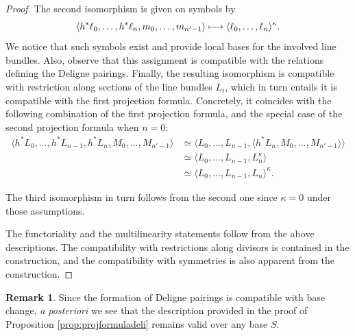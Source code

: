 \documentclass[11pt]{article}
\newcommand\mto{\mathchoice{\longmapsto}{\mapsto}{\mapsto}{\mapsto}}
\theoremstyle{plain}
\theoremstyle{definition}
\newtheorem{remark}[theorem]{Remark}
\begin{document}
\begin{proof}
The second isomorphism is given on symbols by
\begin{equation}\label{eq:explicit-second-projection-formula}
\langle h^{\ast} \ell_{0},\ldots, h^{\ast}\ell_{n},m_{0},\ldots, m_{n^{\prime}-1}\rangle\mto \langle \ell_{0},\ldots,\ell_{n} \rangle^{\kappa}.
\end{equation}
We notice that such symbols exist and provide local bases for the involved line bundles. Also, observe that this assignment is compatible with the relations defining the Deligne pairings. Finally, the resulting isomorphism is compatible with restriction along sections of the line bundles $L_{i}$, which in turn entails it is compatible with the first projection formula. Concretely, it coincides with the following combination of the first projection formula, and the special case of the second projection formula when $n=0$:
\begin{displaymath}
\begin{split}
\langle h^\ast L_0, \ldots, h^\ast L_{n-1}, h^\ast L_n, M_0, \ldots, M_{n'-1} \rangle & \simeq \langle L_0, \ldots, L_{n-1}, \langle h^\ast L_n, M_0, \ldots, M_{n'-1} \rangle \rangle \\
& \simeq \langle L_0, \ldots, L_{n-1}, L_n^{\kappa} \rangle \\
& \simeq \langle L_0, \ldots, L_{n-1}, L_n \rangle^{\kappa}.
\end{split}
\end{displaymath}

The third isomorphism in turn follows from the second one since $\kappa = 0$ under those assumptions.

The functoriality and the multilinearity statements follow from the above descriptions. The compatibility with restrictions along divisors is contained in the construction, and the compatibility with symmetries is also apparent from the construction.
\end{proof}

\begin{remark}
Since the formation of Deligne pairings is compatible with base change, \emph{a posteriori} we see that the description provided in the proof of Proposition \ref{prop:projformuladeli} remains valid over any base $S$.
\end{remark}
\end{document}
